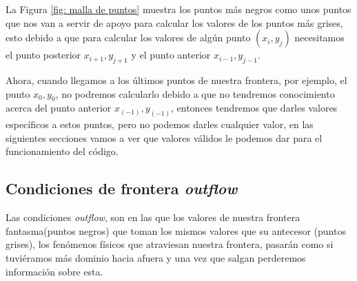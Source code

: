 \documentclass[12pt,a4paper]{book}
\begin{document}
La Figura \ref{fig: malla de puntos} muestra 
los puntos más negros como unos puntos que nos van a 
servir de apoyo para calcular los valores de los puntos más grises, esto debido a que para calcular 
los valores de algún punto $(x_i, y_j)$ necesitamos el punto posterior $x_{i+1}, y_{j+1}$ y el punto 
anterior $x_{i-1}, y_{j-1}$.

Ahora, cuando llegamos a los últimos puntos de nuestra frontera, 
por ejemplo, el punto $x_{0}, y_{0}$, no podremos calcularlo debido a que  no tendremos conocimiento acerca del punto anterior $x_{(-1)}, y_{(-1)}$, entonces  tendremos que darles valores específicos a estos puntos, 
pero no podemos darles cualquier valor, en las siguientes secciones vamos a ver que valores válidos le podemos dar para el funcionamiento del código. 

\subsection{Condiciones de frontera \emph{outflow}}
Las condiciones \emph{outflow}, son en las que los valores de nuestra frontera fantasma(puntos negros) que toman los  mismos valores que su antecesor (puntos grises), los fenómenos físicos que atraviesan nuestra 
frontera, pasarán como si tuviéramos más dominio hacia afuera y una vez que salgan perderemos información sobre esta.
\end{document}
